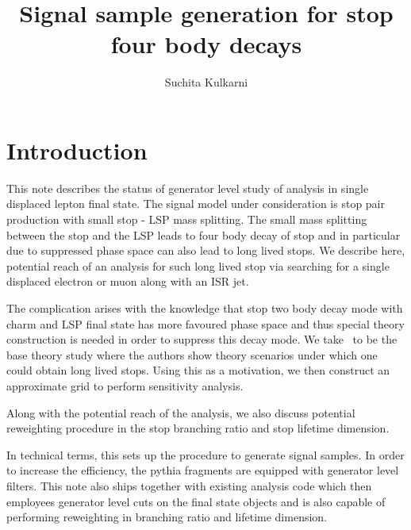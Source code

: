 \documentclass[prd,reprint,nofootinbib,notitlepage,aps,tightenlines,amsmath,amssymb,showpacs,superscriptaddress]{revtex4-1}
\begin{document}
\title{Signal sample generation for stop four body decays}
\author{Suchita Kulkarni}
\begin{abstract}
\noindent 

\end{abstract}
\maketitle
\onecolumngrid
\section{Introduction}
This note describes the status of generator level study of analysis in single displaced lepton final state. The signal model under consideration is stop pair production with small stop - LSP mass splitting. The small mass splitting between the stop and the LSP leads to four body decay of stop and in particular due to suppressed phase space can also lead to long lived stops. We describe here, potential reach of an analysis for such long lived stop via searching for a single displaced electron or muon along with an ISR jet. 

The complication arises with the knowledge that stop two body decay mode with charm and LSP final state has more favoured phase space and thus special theory construction is needed in order to suppress this decay mode. We take~\cite{Grober:2014aha} to be the base theory study where the authors show theory scenarios under which one could obtain long lived stops. Using this as a motivation, we then construct an approximate grid to perform sensitivity analysis. 

Along with the potential reach of the analysis, we also discuss potential reweighting procedure in the stop branching ratio and stop lifetime dimension. 

In technical terms, this sets up the procedure to generate signal samples. In order to increase the efficiency, the pythia fragments are equipped with generator level filters. This note also ships together with existing analysis code which then employees generator level cuts on the final state objects and is also capable of performing reweighting in branching ratio and lifetime dimension. 
\end{document}
